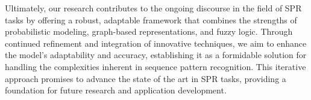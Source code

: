 \documentclass{article}
\begin{document}
Ultimately, our research contributes to the ongoing discourse in the field of SPR tasks by offering a robust, adaptable framework that combines the strengths of probabilistic modeling, graph-based representations, and fuzzy logic. Through continued refinement and integration of innovative techniques, we aim to enhance the model's adaptability and accuracy, establishing it as a formidable solution for handling the complexities inherent in sequence pattern recognition. This iterative approach promises to advance the state of the art in SPR tasks, providing a foundation for future research and application development.



\end{document}
